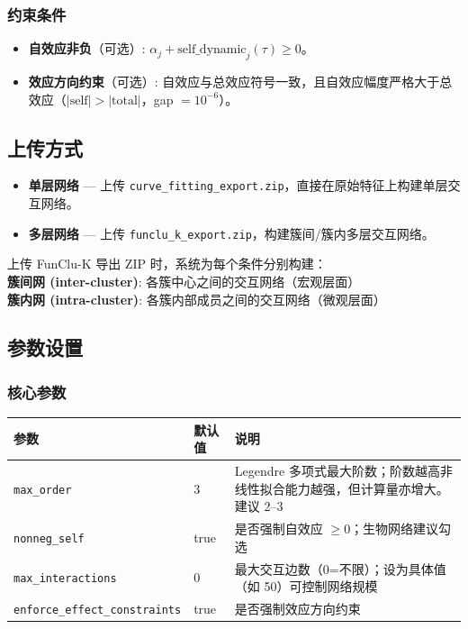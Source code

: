 \documentclass[12pt,a4paper]{ctexart}
\makeatletter
\newcommand{\file}[1]{\texttt{#1}}
\newcommand{\param}[1]{\texttt{#1}}
\newcommand{\paramtable}[1]{%
    \begin{center}
    \small
    \begin{tabular}{@{}llp{5.5cm}@{}}
    \toprule
    \textbf{参数} & \textbf{默认值} & \textbf{说明} \\
    \midrule
    #1
    \bottomrule
    \end{tabular}
    \end{center}
}
\makeatother
\begin{document}
\subsubsection{约束条件}

\begin{itemize}[leftmargin=*]
    \item \textbf{自效应非负}（可选）: $\alpha_j + \text{self\_dynamic}_j(\tau) \geq 0$。
    \item \textbf{效应方向约束}（可选）: 自效应与总效应符号一致，且自效应幅度严格大于总效应（$|\text{self}| > |\text{total}|$，gap $= 10^{-6}$）。
\end{itemize}

\subsection{上传方式}

\begin{itemize}[leftmargin=*]
    \item \textbf{单层网络} --- 上传 \file{curve\_fitting\_export.zip}，直接在原始特征上构建单层交互网络。
    \item \textbf{多层网络} --- 上传 \file{funclu\_k\_export.zip}，构建簇间/簇内多层交互网络。
\end{itemize}

\begin{warnbox}[多层网络说明]
    上传 FunClu-K 导出 ZIP 时，系统为每个条件分别构建：\\
    \textbf{簇间网 (inter-cluster)}: 各簇中心之间的交互网络（宏观层面）\\
    \textbf{簇内网 (intra-cluster)}: 各簇内部成员之间的交互网络（微观层面）
\end{warnbox}

\subsection{参数设置}

\subsubsection{核心参数}

\paramtable{
    \param{max\_order} & 3 & Legendre 多项式最大阶数；阶数越高非线性拟合能力越强，但计算量亦增大。建议 2--3\\
    \param{nonneg\_self} & true & 是否强制自效应 $\geq 0$；生物网络建议勾选\\
    \param{max\_interactions} & 0 & 最大交互边数（0=不限）；设为具体值（如 50）可控制网络规模\\
    \param{enforce\_effect\_constraints} & true & 是否强制效应方向约束\\
}
\end{document}
